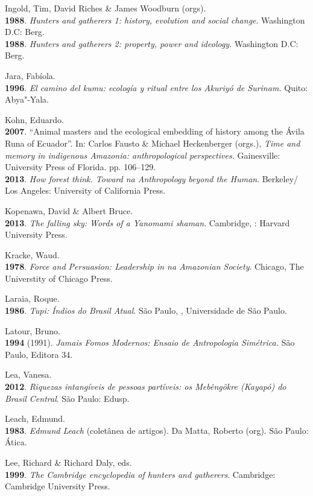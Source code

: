 \begin{Parskip}
Ingold, Tim, David Riches \& James Woodburn (orgs).\\
\textbf{1988}. \emph{Hunters and gatherers 1: history, evolution and
social change}. Washington D.C: Berg.\\
\textbf{1988}. \emph{Hunters and gatherers 2: property, power and
ideology}. Washington D.C: Berg.

Jara, Fabíola.\\
\textbf{1996}. \emph{El camino del kumu: ecología y ritual entre los
Akuriyó de Surinam.} Quito: Abya"-Yala.

Kohn, Eduardo.\\
\textbf{2007}. ``Animal masters and the ecological embedding of history
among the Ávila Runa of Ecuador''. In: Carlos Fausto \& Michael
Heckenberger (orgs.), \emph{Time and memory in indigenous Amazonia:
anthropological perspectives.} Gainesville: University Press of Florida.
pp. 106--129.\\
\textbf{2013}. \emph{How forest think. Toward na Anthropology beyond the
Human}. Berkeley/ Los Angeles: University of California Press.

Kopenawa, David \& Albert Bruce.\\
\textbf{2013}. \emph{The falling sky: Words of a Yanomami shaman}.
Cambridge, : Harvard University Press.

Kracke, Waud.\\
\textbf{1978}. \emph{Force and Persuasion: Leadership in na Amazonian
Society}. Chicago, The Universtity of Chicago Press.

Laraia, Roque.\\
\textbf{1986}. \emph{Tupi: Índios do Brasil Atual}. São Paulo, ,
Universidade de São Paulo.

Latour, Bruno.\\
\textbf{1994} (1991). \emph{Jamais Fomos Modernos: Ensaio de
Antropologia Simétrica.} São Paulo, Editora 34.

Lea, Vanesa.\\
\textbf{2012}. \emph{Riquezas intangíveis de pessoas partíveis: os
Mebêngôkre (Kayapó) do Brasil Central}. São Paulo: Edusp.

Leach, Edmund.\\
\textbf{1983}. \emph{Edmund Leach} (coletânea de artigos). Da Matta,
Roberto (org). São Paulo: Ática.

Lee, Richard \& Richard Daly, eds.\\
\textbf{1999}. \emph{The Cambridge encyclopedia of hunters and
gatherers}. Cambridge: Cambridge University Press.


\end{Parskip}
